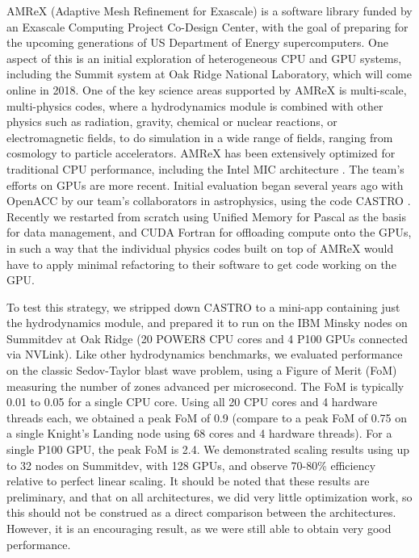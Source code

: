 \documentclass[numberedappendix]{aastex6}
\begin{document}
AMReX (Adaptive Mesh Refinement for Exascale) is a software library funded by an
Exascale Computing Project Co-Design Center, with the goal of preparing for the upcoming
generations of US Department of Energy supercomputers. One aspect of this is an initial
exploration of heterogeneous CPU and GPU systems, including the Summit system at Oak Ridge
National Laboratory, which will come online in 2018. One of the key science areas supported
by AMReX is multi-scale, multi-physics codes, where a hydrodynamics module is combined with
other physics such as radiation, gravity, chemical or nuclear reactions, or electromagnetic
fields, to do simulation in a wide range of fields, ranging from cosmology to particle accelerators.
AMReX has been extensively optimized for traditional CPU performance, including
the Intel MIC architecture \citep{boxlib-tiling}. The team's efforts
on GPUs are more recent. Initial evaluation began several years ago with OpenACC
by our team's collaborators in astrophysics, using the code CASTRO \citep{castro}. Recently we
restarted from scratch using Unified Memory for Pascal as the basis for data management,
and CUDA Fortran for offloading compute onto the GPUs, in such a way that the individual
physics codes built on top of AMReX would have to apply minimal refactoring to their
software to get code working on the GPU.

To test this strategy, we stripped down CASTRO to a mini-app containing just the
hydrodynamics module, and prepared it to run on the IBM Minsky nodes on Summitdev
at Oak Ridge (20 POWER8 CPU cores and 4 P100 GPUs connected via NVLink). Like other
hydrodynamics benchmarks, we evaluated performance on the classic Sedov-Taylor blast
wave problem, using a Figure of Merit (FoM) measuring the number of zones advanced
per microsecond. The FoM is typically 0.01 to 0.05 for a single CPU core. Using all 20 CPU cores and
4 hardware threads each, we obtained a peak FoM of 0.9 (compare to a peak FoM
of 0.75 on a single Knight's Landing node using 68 cores and 4 hardware threads).
For a single P100 GPU, the peak FoM is 2.4. We demonstrated scaling results using up to
32 nodes on Summitdev, with 128 GPUs, and observe 70-80\% efficiency relative to perfect
linear scaling. It should be noted that these results are preliminary, and that on all
architectures, we did very little optimization work, so this should not be construed
as a direct comparison between the architectures. However, it is an encouraging result,
as we were still able to obtain very good performance.
\end{document}
